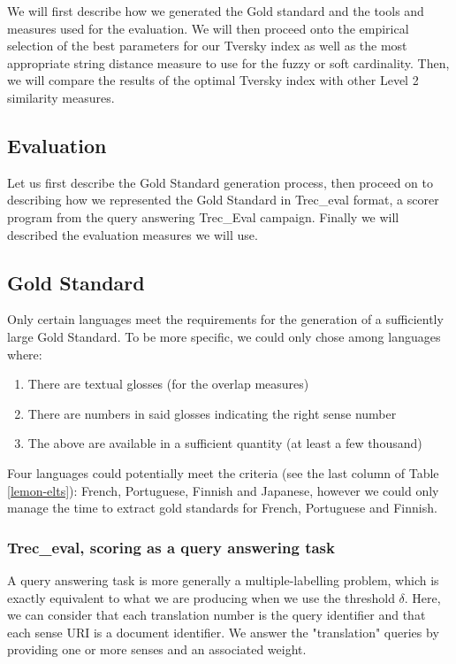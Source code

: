 \documentclass[10pt, a4paper]{article}
\begin{document}
We will first describe how we generated the Gold standard and the tools and measures used for the evaluation. We will then proceed onto the empirical selection of the best parameters for our Tversky index as well as the most appropriate string distance measure to use for the fuzzy or soft cardinality. Then, we will compare the results of the optimal Tversky index with other Level 2 similarity measures.
 
\subsection{Evaluation}
Let us first describe the Gold Standard generation process, then proceed on to describing how we represented the Gold Standard in Trec\_eval format, a scorer program from the query answering Trec\_Eval campaign. Finally we will described the evaluation measures we will use. 
\subsection{Gold Standard}
Only certain languages meet the requirements for the generation of a sufficiently large Gold Standard. To be more specific, we could only chose among languages where:
\begin{enumerate}
	\item There are textual glosses (for the overlap measures)
	\item There are numbers in said glosses indicating the right sense number
	\item The above are available in a sufficient quantity (at least a few thousand)
\end{enumerate}

Four languages could potentially meet the criteria (see the last column of Table \ref{lemon-elts}): French, Portuguese, Finnish and Japanese, however we could only manage the time to extract gold standards for French, Portuguese and Finnish.

\subsubsection{Trec\_eval, scoring as a query answering task}

A query answering task is more generally a multiple-labelling problem, which is exactly equivalent to what we are producing when we use the threshold \(\delta\). Here, we can consider that each translation number is the query identifier and that each sense URI is a document identifier. We answer the "translation" queries by providing one or more senses and an associated weight.
\end{document}
